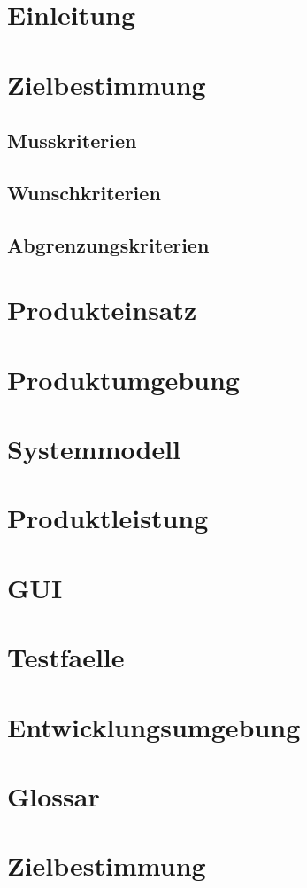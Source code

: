 \documentclass[a4paper,10pt]{article}
\title{\doctitle}
\author{\authorName}
\date{\today}
\begin{document}

\tableofcontents


\section{Einleitung}
\section{Zielbestimmung}
\subsection{Musskriterien}
\subsection{Wunschkriterien}
\subsection{Abgrenzungskriterien}
\section{Produkteinsatz}
\section{Produktumgebung}
\section{Systemmodell}
\section{Produktleistung}
\section{GUI}
\section{Testfaelle}
\section{Entwicklungsumgebung}
\section{Glossar}

\section{Zielbestimmung}
\end{document}
